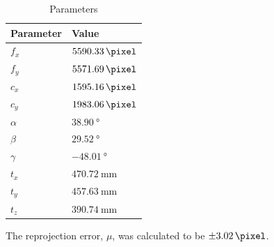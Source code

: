 \begin{longtable}{| C{0.15\textwidth} | C{0.30\textwidth} |}
    \caption{Parameters}                \\
    \hline
    Parameter & Value                   \\
    \endfirsthead
    \hline
    \hline
    $f_x$     & $\qty{5590.33}{\pixel}$ \\
    $f_y$     & $\qty{5571.69}{\pixel}$ \\
    \hline
    $c_x$     & $\qty{1595.16}{\pixel}$ \\
    $c_y$     & $\qty{1983.06}{\pixel}$ \\
    \hline
    $\alpha$  & $\qty{38.90}{\degree}$  \\
    $\beta$   & $\qty{29.52}{\degree}$  \\
    $\gamma$  & $\qty{-48.01}{\degree}$ \\
    \hline
    $t_x$     & $\qty{470.72}{\mm}$     \\
    $t_y$     & $\qty{457.63}{\mm}$     \\
    $t_z$     & $\qty{390.74}{\mm}$     \\
\end{longtable}

The reprojection error, $\mu$, was calculated to be $\pm \qty{3.02}{\pixel}$.

